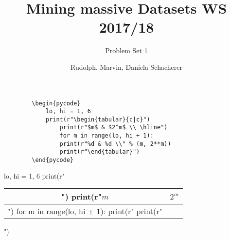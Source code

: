 \documentclass[11pt,a4paper]{scrartcl}
\title{Mining massive Datasets WS 2017/18}
\subtitle{Problem Set 1}
\author{Rudolph, Marvin, Daniela Schacherer}
\begin{document}
	\maketitle
	
	\begin{verbatim}
		\begin{pycode}
			lo, hi = 1, 6
			print(r"\begin{tabular}{c|c}")
				print(r"$m$ & $2^m$ \\ \hline")
				for m in range(lo, hi + 1):
				print(r"%d & %d \\" % (m, 2**m))
				print(r"\end{tabular}")
		\end{pycode}
	\end{verbatim}
	
	
	\begin{pycode}
		lo, hi = 1, 6
		print(r"\begin{tabular}{c|c}")
			print(r"$m$ & $2^m$ \\ \hline")
			for m in range(lo, hi + 1):
			print(r"%
			print(r"\end{tabular}")
	\end{pycode}
	
\end{document}
